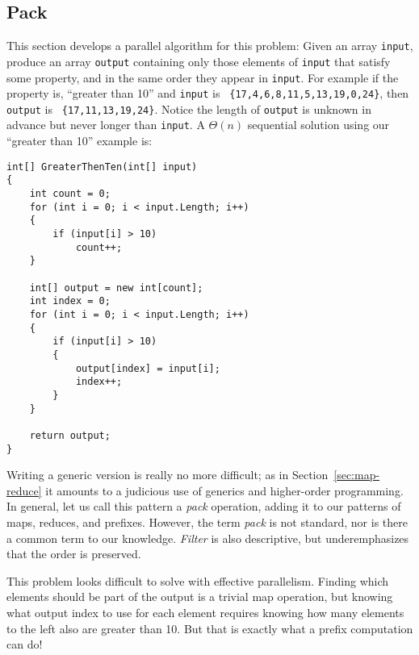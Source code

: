 \documentclass[10pt]{article}
\begin{document}
\subsection{Pack}
\label{sec:pack}

This section develops a parallel algorithm for this problem: Given an array
{\tt input}, produce an array {\tt output} containing only those
elements of {\tt input} that satisfy some property, and in the same
order they appear in {\tt input}.  For example if the property is,
``greater than 10'' and {\tt input} is {\tt
  \{17,4,6,8,11,5,13,19,0,24\}}, then {\tt output} is {\tt
  \{17,11,13,19,24\}}.  Notice the length of {\tt output} is unknown in
advance but never longer than {\tt input}.  A $\Theta(n)$ sequential
solution using our ``greater than 10'' example is:

\begin{verbatim}
int[] GreaterThenTen(int[] input)
{
    int count = 0;
    for (int i = 0; i < input.Length; i++)
    {
        if (input[i] > 10)
            count++;
    }

    int[] output = new int[count];
    int index = 0;
    for (int i = 0; i < input.Length; i++)
    {
        if (input[i] > 10)
        {
            output[index] = input[i];
            index++;
        }
    }

    return output;
}
\end{verbatim}
Writing a generic version is really no more difficult; as in
Section~\ref{sec:map-reduce} it amounts to a judicious use of generics
and higher-order programming.  In general, let us call this pattern a
\emph{pack} operation, adding it to our patterns of maps, reduces, and
prefixes.  However, the term \emph{pack} is not standard, nor is there
a common term to our knowledge.  \emph{Filter} is also descriptive,
but underemphasizes that the order is preserved.

This problem looks difficult to solve with effective
parallelism.  Finding which elements should be part of the output is a
trivial map operation, but knowing what output index to
use for each element requires knowing how many elements to the left
also are greater than 10.  But that is exactly what a prefix
computation can do!
\end{document}
